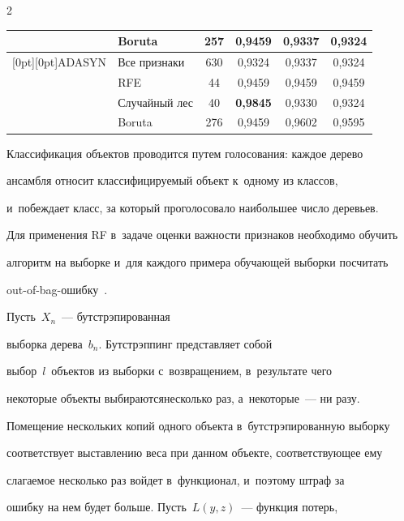 \begin{multicols}{2}
\begin{table}[b]
\begin{center}
\begin{tabular}{|l|l|c|c|c|c|}
&Boruta&257&0,9459&0,9337&0,9324\\

\hline

\raisebox{-18pt}[0pt][0pt]{ADASYN}&Все признаки&630&0,9324&0,9337&0,9324\\

&RFE&\hphantom{9}44&0,9459&0,9459&0,9459\\

&Случайный лес&\hphantom{9}40&\textbf{0,9845}&0,9330&0,9324\\

&Boruta&276&0,9459&0,9602&0,9595\\

\hline

\end{tabular}

\end{center}

\end{table}

  

  Классификация объектов проводится путем голо\-со\-ва\-ния: каждое дерево 

ансамбля относит классифицируемый объект к~одному из классов, 

и~побеждает класс, за который проголосовало наибольшее число деревьев. 

Для применения RF в~задаче оценки важности признаков необходимо обучить 

алгоритм на выборке и~для каждого примера обучающей выборки посчитать 

out-of-bag-ошиб\-ку~\cite{10-sev}. 



Пусть~$X_n$~--- бутстрэпированная 

выборка дере\-ва~$b_n$. Бутстрэппинг представляет собой 

выбор~$l$~объектов из выборки с~возвращением, в~результате чего 

некоторые объекты выбираются\linebreak несколь\-ко раз, а~некоторые~--- ни разу. 

Помещение нескольких копий одного объекта в~бутстрэпированную выборку 

соответствует выставлению веса при данном объекте, соответствующее ему 

слагаемое несколько раз \mbox{войдет} в~функционал, и~поэтому штраф за 

ошибку на нем будет больше. Пусть~$L(y, z)$~--- функция потерь,  


\end{multicols}
